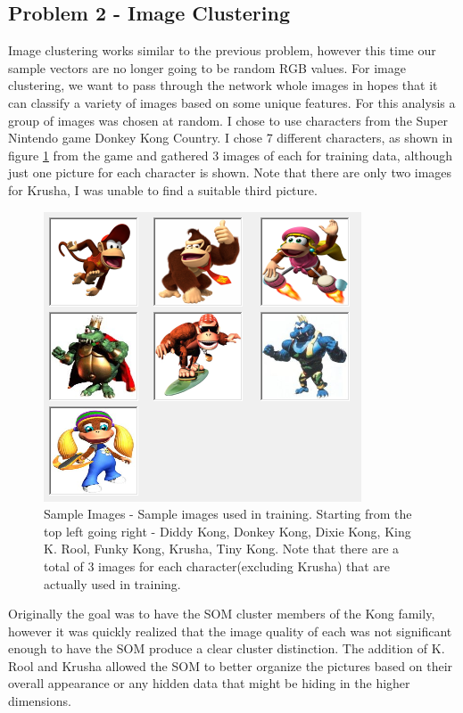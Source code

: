 \documentclass{IEEEtran}
\begin{document}
\subsection{Problem 2 - Image Clustering}
Image clustering works similar to the previous problem, however this time our sample vectors are no longer going to be random RGB values. For image clustering, we want to pass through the network whole images in hopes that it can classify a variety of images based on some unique features. For this analysis a group of images was chosen at random. I chose to use characters from the Super Nintendo game Donkey Kong Country. I chose 7 different characters, as shown in figure \ref{fig:picturesamples} from the game and gathered 3 images of each for training data, although just one picture for each character is shown. Note that there are only two images for Krusha, I was unable to find a suitable third picture. 

\begin{figure}[!htbp]
\centering
\includegraphics[scale=0.50]{./images/picture_samples.png}
	\caption{Sample Images - Sample images used in training. Starting from the top left going right - Diddy Kong, Donkey Kong, Dixie Kong, King K. Rool, Funky Kong, Krusha, Tiny Kong. Note that there are a total of 3 images for each character(excluding Krusha) that are actually used in training.}
\label{fig:picturesamples} 
\end{figure}

Originally the goal was to have the SOM cluster members of the Kong family, however it was quickly realized that the image quality of each was not significant enough to have the SOM produce a clear cluster distinction. The addition of K. Rool and Krusha allowed the SOM to better organize the pictures based on their overall appearance or any hidden data that might be hiding in the higher dimensions.
\end{document}
